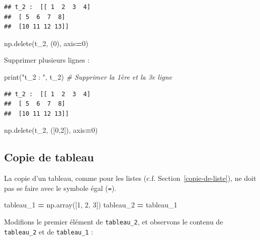 \documentclass[12pt,]{book}
\newenvironment{Shaded}{\begin{snugshade}}{\end{snugshade}}
\newcommand{\DecValTok}[1]{\textcolor[rgb]{0.00,0.00,0.81}{#1}}
\newcommand{\StringTok}[1]{\textcolor[rgb]{0.31,0.60,0.02}{#1}}
\newcommand{\CommentTok}[1]{\textcolor[rgb]{0.56,0.35,0.01}{\textit{#1}}}
\newcommand{\OperatorTok}[1]{\textcolor[rgb]{0.81,0.36,0.00}{\textbf{#1}}}
\newcommand{\BuiltInTok}[1]{#1}
\newcommand{\NormalTok}[1]{#1}
\numberwithin{equation}{section}
\numberwithin{countremarque}{section}
\begin{document}
\begin{lstlisting}
## t_2 :  [[ 1  2  3  4]
##  [ 5  6  7  8]
##  [10 11 12 13]]
\end{lstlisting}

\begin{Shaded}
\begin{Highlighting}[]
\NormalTok{np.delete(t_2, (}\DecValTok{0}\NormalTok{), axis}\OperatorTok{=}\DecValTok{0}\NormalTok{)}
\end{Highlighting}
\end{Shaded}

Supprimer plusieurs lignes :

\begin{Shaded}
\begin{Highlighting}[]
\BuiltInTok{print}\NormalTok{(}\StringTok{"t_2 : "}\NormalTok{, t_2)}
\CommentTok{# Supprimer la 1ère et la 3e ligne}
\end{Highlighting}
\end{Shaded}

\begin{lstlisting}
## t_2 :  [[ 1  2  3  4]
##  [ 5  6  7  8]
##  [10 11 12 13]]
\end{lstlisting}

\begin{Shaded}
\begin{Highlighting}[]
\NormalTok{np.delete(t_2, ([}\DecValTok{0}\NormalTok{,}\DecValTok{2}\NormalTok{]), axis}\OperatorTok{=}\DecValTok{0}\NormalTok{)}
\end{Highlighting}
\end{Shaded}

\subsection{Copie de tableau}\label{copie-de-tableau}

La copie d'un tableau, comme pour les listes (c.f.
Section~\ref{copie-de-liste}), ne doit pas se faire avec le symbole égal
(\texttt{=}).

\begin{Shaded}
\begin{Highlighting}[]
\NormalTok{tableau_1 }\OperatorTok{=}\NormalTok{ np.array([}\DecValTok{1}\NormalTok{, }\DecValTok{2}\NormalTok{, }\DecValTok{3}\NormalTok{])}
\NormalTok{tableau_2 }\OperatorTok{=}\NormalTok{ tableau_1}
\end{Highlighting}
\end{Shaded}

Modifions le premier élément de \texttt{tableau\_2}, et observons le
contenu de \texttt{tableau\_2} et de \texttt{tableau\_1} :
\end{document}
